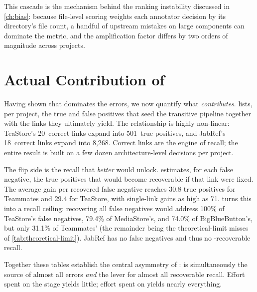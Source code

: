 

This cascade is the mechanism behind the ranking instability discussed in
\cref{ch:bias}: because file-level scoring weights each annotator decision by
its directory's file count, a handful of upstream mistakes on large components
can dominate the metric, and the amplification factor differs by two orders of
magnitude across projects.

\section{Actual Contribution of \sadsam}
\label{sec:transarc:contribution}

Having shown that \sadsam dominates the errors, we now quantify what \sadsam
\emph{contributes}.  lists, per project, the
\sadsam true and false positives that seed the transitive pipeline together
with the \sadcode links they ultimately yield. The relationship is highly
non-linear: TeaStore's 20~correct \sadsam links expand into 501~\sadcode true
positives, and JabRef's 18~correct links expand into 8{,}268. Correct \sadsam
links are the engine of recall; the entire \transarc result is built on a few
dozen architecture-level decisions per project.



The flip side is the recall that \emph{better} \sadsam would unlock.
 estimates, for each \sadsam false negative, the
\sadcode true positives that would become recoverable if that link were fixed.
The average gain per recovered \sadsam false negative reaches 30.8 \sadcode true
positives for Teammates and 29.4 for TeaStore, with single-link gains as high as
71.  turns this into a recall ceiling: recovering all
\sadsam false negatives would address 100\% of TeaStore's \sadcode false
negatives, 79.4\% of MediaStore's, and 74.0\% of BigBlueButton's, but only
31.1\% of Teammates' (the remainder being the theoretical-limit misses of
\cref{tab:theoretical-limit}). JabRef has no \sadsam false negatives and thus no
\sadsam-recoverable recall.





Together these tables establish the central asymmetry of \transarc: \sadsam is
simultaneously the source of almost all errors \emph{and} the lever for almost
all recoverable recall. Effort spent on the \samcode stage yields little; effort
spent on \sadsam yields nearly everything.


